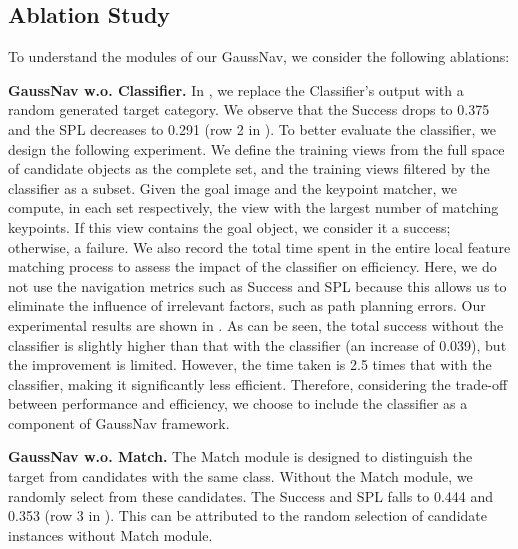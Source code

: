





\subsection{Ablation Study}




To understand the modules of our GaussNav, we consider the following ablations:

\textbf{GaussNav w.o. Classifier.} In , we replace the Classifier's output with a random generated target category. We observe that the Success drops to 0.375 and the SPL decreases to 0.291 (row 2 in ). To better evaluate the classifier, we design the following experiment. We define the training views from the full space of candidate objects as the complete set, and the training views filtered by the classifier as a subset. Given the goal image and the keypoint matcher, we compute, in each set respectively, the view with the largest number of matching keypoints. If this view contains the goal object, we consider it a success; otherwise, a failure. We also record the total time spent in the entire local feature matching process to assess the impact of the classifier on efficiency. Here, we do not use the navigation metrics such as Success and SPL because this allows us to eliminate the influence of irrelevant factors, such as path planning errors. Our experimental results are shown in . As can be seen, the total success without the classifier is slightly higher than that with the classifier (an increase of 0.039), but the improvement is limited. However, the time taken is 2.5 times that with the classifier, making it significantly less efficient. Therefore, considering the trade-off between performance and efficiency, we choose to include the classifier as a component of GaussNav framework.



\textbf{GaussNav w.o. Match.} The Match module is designed to distinguish the target from candidates with the same class. Without the Match module, we randomly select from these candidates. The Success and SPL falls to 0.444 and 0.353 (row 3 in ). This can be attributed to the random selection of candidate instances without Match module.

